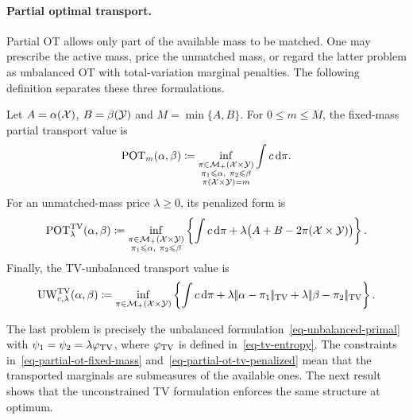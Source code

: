 \paragraph{Partial optimal transport.}
Partial OT allows only part of the available mass to be matched. One may prescribe the active mass, price the unmatched mass, or regard the latter problem as unbalanced OT with total-variation marginal penalties. The following definition separates these three formulations.
\begin{defn}\label{def-partial-optimal-transport}
Let $A=\alpha(\mathcal{X})$, $B=\beta(\mathcal{Y})$ and $M=\min\{A,B\}$. For $0\leq m\leq M$, the fixed-mass partial transport value is
\begin{equation}\label{eq-partial-ot-fixed-mass}
\operatorname{POT}_m(\alpha,\beta)
\coloneqq
\inf_{\substack{\pi\in\mathcal{M}_+(\mathcal{X}\times\mathcal{Y})\\
\pi_1\leqslant\alpha,\ \pi_2\leqslant\beta\\
\pi(\mathcal{X}\times\mathcal{Y})=m}}
\int c\,\mathrm{d}\pi.
\end{equation}
For an unmatched-mass price $\lambda\geq0$, its penalized form is
\begin{equation}\label{eq-partial-ot-tv-penalized}
\operatorname{POT}^{\operatorname{TV}}_\lambda(\alpha,\beta)
\coloneqq
\inf_{\substack{\pi\in\mathcal{M}_+(\mathcal{X}\times\mathcal{Y})\\
\pi_1\leqslant\alpha,\ \pi_2\leqslant\beta}}
\left\{
\int c\,\mathrm{d}\pi
+\lambda\bigl(A+B-2\pi(\mathcal{X}\times\mathcal{Y})\bigr)
\right\}.
\end{equation}
Finally, the TV-unbalanced transport value is
\begin{equation}\label{eq-partial-ot-tv-unbalanced}
\operatorname{UW}_{c,\lambda}^{\operatorname{TV}}(\alpha,\beta)
\coloneqq
\inf_{\pi\in\mathcal{M}_+(\mathcal{X}\times\mathcal{Y})}
\left\{
\int c\,\mathrm{d}\pi
+\lambda|\!| \alpha-\pi_1 |\!|_{\operatorname{TV}}
+\lambda|\!| \beta-\pi_2 |\!|_{\operatorname{TV}}
\right\}.
\end{equation}
\end{defn}
The last problem is precisely the unbalanced formulation~\eqref{eq-unbalanced-primal} with $\psi_1=\psi_2=\lambda\varphi_{\operatorname{TV}}$, where $\varphi_{\operatorname{TV}}$ is defined in~\eqref{eq-tv-entropy}. The constraints in~\eqref{eq-partial-ot-fixed-mass} and~\eqref{eq-partial-ot-tv-penalized} mean that the transported marginals are submeasures of the available ones. The next result shows that the unconstrained TV formulation enforces the same structure at optimum.

